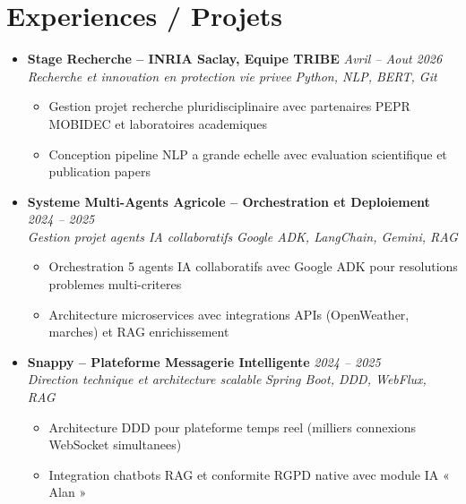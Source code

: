 \documentclass[a4paper,11pt]{article}
\begin{document}
\section{Experiences / Projets}
\begin{itemize}[leftmargin=*, label={-}]

\item \textbf{Stage Recherche -- INRIA Saclay, Equipe TRIBE} \hfill \textit{Avril -- Aout 2026} \\
\textit{Recherche et innovation en protection vie privee} \hfill \textit{Python, NLP, BERT, Git}
\vspace{-2pt}
    \begin{itemize}[leftmargin=0.4cm, nosep, label=\tiny$\bullet$]
        \item \small{Gestion projet recherche pluridisciplinaire avec partenaires PEPR MOBIDEC et laboratoires academiques}
        \item \small{Conception pipeline NLP a grande echelle avec evaluation scientifique et publication papers}
    \end{itemize}
\vspace{3pt}

\item \textbf{Systeme Multi-Agents Agricole -- Orchestration et Deploiement} \hfill \textit{2024 -- 2025} \\
\textit{Gestion projet agents IA collaboratifs} \hfill \textit{Google ADK, LangChain, Gemini, RAG}
\vspace{-2pt}
    \begin{itemize}[leftmargin=0.4cm, nosep, label=\tiny$\bullet$]
        \item \small{Orchestration 5 agents IA collaboratifs avec Google ADK pour resolutions problemes multi-criteres}
        \item \small{Architecture microservices avec integrations APIs (OpenWeather, marches) et RAG enrichissement}
    \end{itemize}
\vspace{3pt}

\item \textbf{Snappy -- Plateforme Messagerie Intelligente} \hfill \textit{2024 -- 2025} \\
\textit{Direction technique et architecture scalable} \hfill \textit{Spring Boot, DDD, WebFlux, RAG}
\vspace{-2pt}
    \begin{itemize}[leftmargin=0.4cm, nosep, label=\tiny$\bullet$]
        \item \small{Architecture DDD pour plateforme temps reel (milliers connexions WebSocket simultanees)}
        \item \small{Integration chatbots RAG et conformite RGPD native avec module IA « Alan »}
    \end{itemize}
\vspace{3pt}


\end{itemize}
\end{document}
